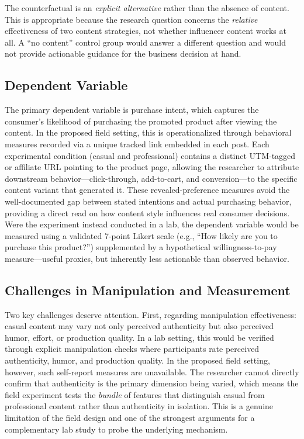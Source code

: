 \documentclass[10pt]{article}
\begin{document}
The counterfactual is an \textit{explicit alternative} rather than the absence of content. This is appropriate because the research question concerns the \textit{relative} effectiveness of two content strategies, not whether influencer content works at all. A ``no content'' control group would answer a different question and would not provide actionable guidance for the business decision at hand.

\subsection{Dependent Variable}

The primary dependent variable is purchase intent, which captures the consumer's likelihood of purchasing the promoted product after viewing the content. In the proposed field setting, this is operationalized through behavioral measures recorded via a unique tracked link embedded in each post. Each experimental condition (casual and professional) contains a distinct UTM-tagged or affiliate URL pointing to the product page, allowing the researcher to attribute downstream behavior---click-through, add-to-cart, and conversion---to the specific content variant that generated it. These revealed-preference measures avoid the well-documented gap between stated intentions and actual purchasing behavior, providing a direct read on how content style influences real consumer decisions. Were the experiment instead conducted in a lab, the dependent variable would be measured using a validated 7-point Likert scale (e.g., ``How likely are you to purchase this product?'') supplemented by a hypothetical willingness-to-pay measure---useful proxies, but inherently less actionable than observed behavior.

\subsection{Challenges in Manipulation and Measurement}

Two key challenges deserve attention. First, regarding manipulation effectiveness: casual content may vary not only perceived authenticity but also perceived humor, effort, or production quality. In a lab setting, this would be verified through explicit manipulation checks where participants rate perceived authenticity, humor, and production quality. In the proposed field setting, however, such self-report measures are unavailable. The researcher cannot directly confirm that authenticity is the primary dimension being varied, which means the field experiment tests the \textit{bundle} of features that distinguish casual from professional content rather than authenticity in isolation. This is a genuine limitation of the field design and one of the strongest arguments for a complementary lab study to probe the underlying mechanism.
\end{document}

